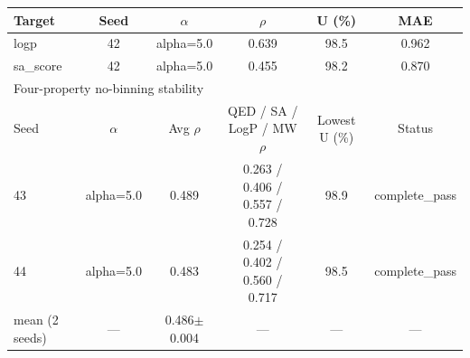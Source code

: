 \begin{tabular}{l c c c c c}
\toprule
Target & Seed & $\alpha$ & $\rho$ & U (\%) & MAE \\
\midrule
logp & 42 & alpha=5.0 & 0.639 & 98.5 & 0.962 \\
sa\_score & 42 & alpha=5.0 & 0.455 & 98.2 & 0.870 \\
\midrule
\multicolumn{6}{l}{Four-property no-binning stability} \\
Seed & $\alpha$ & Avg $\rho$ & QED / SA / LogP / MW $\rho$ & Lowest U (\%) & Status \\
\midrule
43 & alpha=5.0 & 0.489 & 0.263 / 0.406 / 0.557 / 0.728 & 98.9 & complete\_pass \\
44 & alpha=5.0 & 0.483 & 0.254 / 0.402 / 0.560 / 0.717 & 98.5 & complete\_pass \\
\midrule
mean (2 seeds) & --- & 0.486$\pm$0.004 & --- & --- & --- \\
\bottomrule
\end{tabular}
